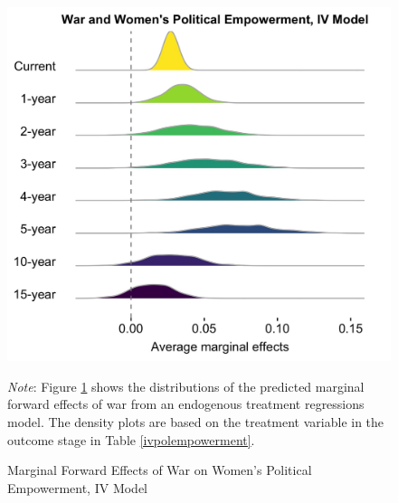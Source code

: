 \documentclass [12pt] {article}
\renewcommand{\footnotesize}{\scriptsize} %
\begin{document}
\begin{figure}[h]
   \centering
    \caption{Marginal Forward Effects of War on Women's Political Empowerment, IV Model}
    \label{IV}
	\includegraphics[scale=.15]{Fig4.jpg}
  \begin{flushleft}  
        {\footnotesize {\it Note}: Figure \ref{IV} shows the distributions of the predicted marginal forward effects of war from an endogenous treatment regressions model. The density plots are based on the treatment variable in the outcome stage %
 in Table \ref{ivpolempowerment}. }
       \end{flushleft} 
\end{figure}
\end{document}
